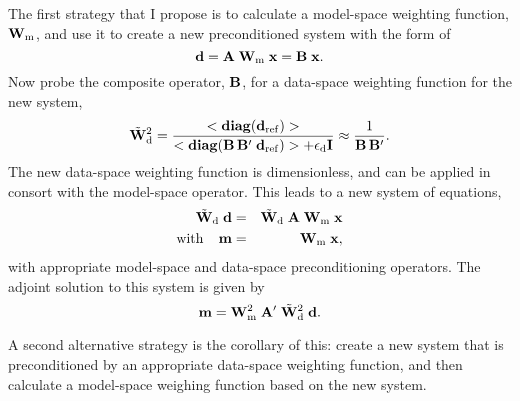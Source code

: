 \par
The first strategy that I propose is to calculate a
model-space weighting function, ${\bf W}_{\rm m}$, and use it to
create a new preconditioned system with the form of 
\[
{\bf d} = {\bf A} \; {\bf W}_{\rm m} \; {\bf x} = {\bf B} \; {\bf x}.
\]
Now probe the composite operator, ${\bf B}$, for a data-space
weighting function for the new system,
\begin{equation}  \label{eqn:both}
\tilde{\bf W}_{\rm d}^{2} = \frac{ <{\rm\bf diag} ({\bf d}_{\rm ref})> }
{<{\rm\bf diag} ({\bf B}\, {\bf B}' \; {\bf d}_{\rm ref})> +
\epsilon_{\rm d} {\bf I}} \approx 
\frac{1}{{\bf B}\, {\bf B}'}.
\end{equation}
The new data-space weighting function is dimensionless, and can be
applied in consort with the model-space operator. This leads to a new
system of equations,
\begin{eqnarray}
\tilde{\bf W}_{\rm d} \; {\bf d} &=& \tilde{\bf W}_{\rm d} \; {\bf A}\;
{\bf W}_{\rm m} \; {\bf x} \\
{\rm with} \hspace{0.15in}
{\bf m}& =& {\bf W}_{\rm m}\; {\bf x}, \nonumber
\end{eqnarray}
with appropriate model-space and data-space preconditioning 
operators. 
The adjoint solution to this system is given by
\begin{equation}
{\bf m} = {\bf W}_{\rm m}^2 \; {\bf A}' \; \tilde{\bf W}_{\rm d}^2 
\; {\bf d}.
\end{equation}

\par
A second alternative strategy is the corollary of this: create a new
system that is preconditioned by an appropriate data-space weighting
function, and then calculate a model-space weighing function based on
the new system.

